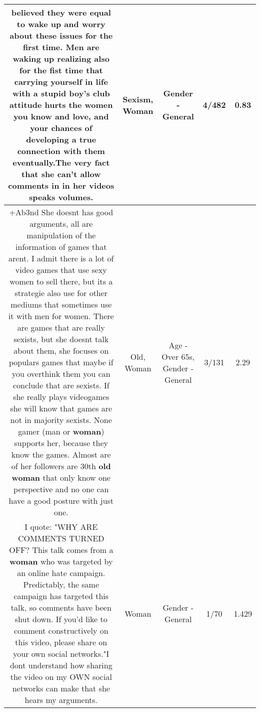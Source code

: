 \documentclass[11pt]{article}
\newlength\mylength
\begin{document}
\begin{center}
\begin{longtable}{|C{.65\mylength}|C{.30\mylength}|C{.12\mylength}|C{.12\mylength}|C{.12\mylength}|}
believed they were equal to wake up and worry about these issues for the first time. Men are waking up realizing also for the fist time that carrying yourself in life with a stupid boy's club attitude hurts the women you know and love, and your chances of developing a true connection with them eventually.The very fact that she can't allow comments in in her videos speaks volumes.\normalsize   & Sexism, Woman & Gender - General & 4/482 & 0.83 \\  \hline
  \small +Ab3nd She doesnt has good arguments, all are manipulation of the information of games that arent. I admit there is a lot of video games that use sexy women to sell there, but its a strategie also use for other mediums that sometimes use it with men for women. There are games that are really sexists, but she doesnt talk about them, she focuses on populars games that maybe if you overthink them you can conclude that are sexists. If she really plays videogames she will know that games are not in majority sexists. None gamer (man or \textbf{woman}) supports her, because they know the games. Almost are of her followers are 30th \textbf{old} \textbf{woman} that only know one perspective and no one can have a good posture with just one.\normalsize   & Old, Woman & Age - Over 65s, Gender - General & 3/131 & 2.29 \\  \hline
  \small I quote: "WHY ARE COMMENTS TURNED OFF? This talk comes from a \textbf{woman} who was targeted by an online hate campaign. Predictably, the same campaign has targeted this talk, so comments have been shut down. If you'd like to comment constructively on this video, please share on your own social networks."I dont understand how sharing the video on my OWN social networks can make that she hears my arguments.\normalsize   & Woman & Gender - General & 1/70 & 1.429 \\  \hline

\end{longtable}
\end{center}
\end{document}
